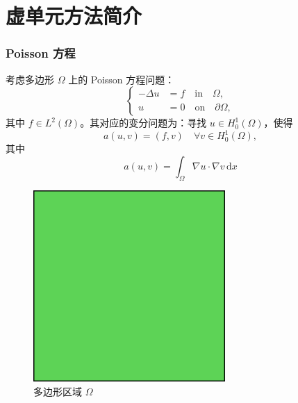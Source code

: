 \documentclass[notheorems,serif]{beamer}
\begin{document}
\section{虚单元方法简介}
%
\begin{frame}\frametitle{Poisson 方程}
\begin{minipage}[b]{0.6\linewidth}
考虑多边形 $\Omega$ 上的 Poisson 方程问题：
$$
\left\{
\begin{aligned}
-\Delta u &= f \quad \text{in} \quad \Omega, \\
u &= 0 \quad \text{on} \quad \partial \Omega,
\end{aligned}
\right.
$$
其中 $f \in L^2(\Omega)$。其对应的变分问题为：寻找 $u \in H^1_0(\Omega)$，使得
$$
a(u, v) = (f, v) \quad \forall v \in H^1_0(\Omega),
$$
其中 
$$
a(u, v) = \int_{\Omega} \nabla u \cdot \nabla v \, \mathrm{d} x
$$
\end{minipage}
\hfill
\begin{minipage}[b]{0.38\linewidth}
    \centering
    \begin{figure}[htpb]
        \centering
        \includegraphics[width=0.65\textwidth]{../figures/domain_quad.pdf}
        \caption{多边形区域 $\Omega$}
    \end{figure}
\end{minipage}

\end{frame}
\end{document}
